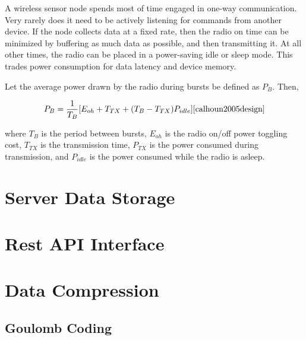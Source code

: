 A wireless sensor node spends most of time engaged in one-way communication. Very rarely does it need to be actively listening for commands from another device. If the node collects data at a fixed rate, then the radio on time can be minimized by buffering as much data as possible, and then transmitting it. At all other times, the radio can be placed in a power-saving idle or sleep mode. This trades power consumption for data latency and device memory.

Let the average power drawn by the radio during bursts be defined as $P_{B}$. Then, 

\begin{equation}
P_{B} = \frac{1}{T_{B}}[E_{oh} + T_{TX} +(T_{B}-T_{TX})P_{idle}]\cite{calhoun2005design}
\end{equation}

where $T_{B}$ is the period between bursts, $E_{oh}$ is the radio on/off power toggling cost, $T_{TX}$ is the transmission time, $P_{TX}$ is the power consumed during transmission, and $P_{idle}$ is the power consumed while the radio is asleep.



 
\section{Server Data Storage}
\section{Rest API Interface}
\section{Data Compression}
\subsection{Goulomb Coding}

